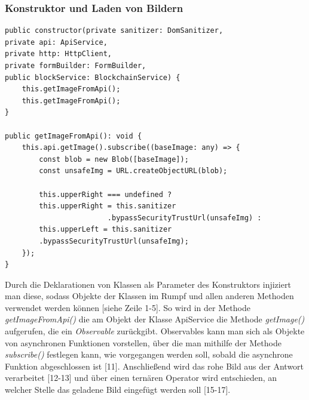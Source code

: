 \subsubsection{Konstruktor und Laden von Bildern}
\begin{lstlisting}[caption={Konstruktor und Laden von Bildern im Frontend},captionpos=b]
public constructor(private sanitizer: DomSanitizer,
private api: ApiService,
private http: HttpClient,
private formBuilder: FormBuilder,
public blockService: BlockchainService) {
	this.getImageFromApi();
	this.getImageFromApi();
}

public getImageFromApi(): void {
	this.api.getImage().subscribe((baseImage: any) => {
		const blob = new Blob([baseImage]);
		const unsafeImg = URL.createObjectURL(blob);
		
		this.upperRight === undefined ?
		this.upperRight = this.sanitizer
						.bypassSecurityTrustUrl(unsafeImg) :
		this.upperLeft = this.sanitizer
		.bypassSecurityTrustUrl(unsafeImg);
	});
}
\end{lstlisting}
Durch die Deklarationen von Klassen als Parameter des Konstruktors injiziert man diese, sodass Objekte der Klassen im Rumpf und allen anderen Methoden verwendet werden können [siehe Zeile 1-5]. So wird in der Methode \emph{getImageFromApi()} die am Objekt der Klasse ApiService die Methode \emph{getImage()} aufgerufen, die ein \emph{Observable} zurückgibt. Observables kann man sich als Objekte von asynchronen Funktionen vorstellen, über die man mithilfe der Methode \emph{subscribe()} festlegen kann, wie vorgegangen werden soll, sobald die asynchrone Funktion abgeschlossen ist [11]. Anschließend wird das rohe Bild aus der Antwort verarbeitet [12-13] und über einen ternären Operator wird entschieden, an welcher Stelle das geladene Bild eingefügt werden soll [15-17].
